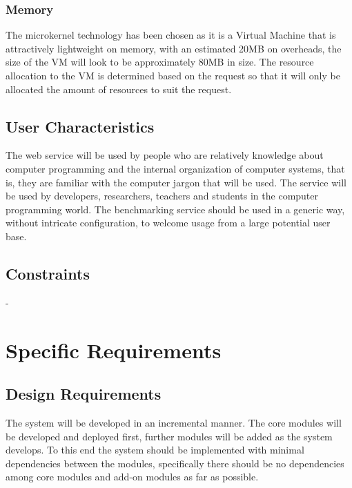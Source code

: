 \documentclass[runningheads,a4paper]{article}
\begin{document}
		\subsubsection{Memory}
			The microkernel technology has been chosen as it is a Virtual Machine that is attractively lightweight on memory, with an estimated 20MB on overheads, the size of the VM will look to be approximately 80MB in size. The resource allocation to the VM is determined based on the request so that it will only be allocated the amount of resources to suit the request. \newline




\subsection{User Characteristics}
	The web service will be used by people who are relatively knowledge about computer programming and the internal 
	organization of computer systems, that is, they are familiar with the computer jargon that will be used. The service
	will be used by developers, researchers, teachers and students in the computer programming world. The benchmarking
	service should be used in a generic way, without intricate configuration, to welcome usage from a large potential 
	user base.
\subsection{Constraints}



-



\section{Specific Requirements}
    \subsection{Design Requirements}
    The system will be developed in an incremental manner. The core modules will be developed and deployed first, further modules will be added as the system develops. 
    To this end the system should be implemented with minimal dependencies between the modules, specifically there should be no dependencies among core modules and add-on modules as far as possible.
\end{document}
